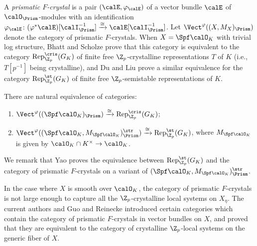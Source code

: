 A \emph{prismatic $F$-crystal} is a pair $(\calE,\varphi_\calE)$ of a vector bundle $\calE$ of $\calO_\Prism$-modules with an identification $\varphi_{\calE}\colon (\varphi^\ast\calE)[\calI_\Prism^{-1}]\xrightarrow{\cong}\calE[\calI_\Prism^{-1}]$. Let $\Vect^\varphi((X,M_X)_\Prism)$ denote the category of prismatic $F$-crystals.
When $X=\Spf \calO_K$ with trivial log structure, Bhatt and Scholze \cite{bhatt-scholze-prismaticFcrystal} prove that this category is equivalent to the category $\operatorname{Rep}_{\Z_p}^\cris(G_K)$ of finite free $\Z_p$-crystalline representations $T$ of $K$ (i.e., $T[p^{-1}]$ being crystalline), and Du and Liu \cite{du-liu-prismaticphiGhatmodule} prove a similar equivalence for the category $\operatorname{Rep}_{\Z_p}^\st(G_K)$ of finite free $\Z_p$-semistable representations of $K$.

\begin{thm} \label{thm:intro-BhattScholze-DuLiu}
There are natural equivalence of categories:
\begin{enumerate}
    \item $\Vect^\varphi((\Spf\calO_K)_\Prism)\xrightarrow{\cong}
\operatorname{Rep}_{\Z_p}^\cris(G_K)$;
    \item $\Vect^\varphi((\Spf\calO_K, M_{\Spf \calO_K})_\Prism^{\str}) \xrightarrow{\cong}
\operatorname{Rep}_{\Z_p}^\st(G_K)$, where $M_{\Spf \calO_K}$ is given by $\calO_K\cap K^\times\rightarrow \calO_K$.
\end{enumerate}
\end{thm}

\noindent We remark that Yao \cite{yao-lattices-semistable-representations} proves the equivalence between $\operatorname{Rep}_{\Z_p}^\st(G_K)$ and the category of prismatic $F$-crystals on a variant of $(\Spf\calO_K, M_{\Spf \calO_K})_\Prism^{\str}$.

In the case where $X$ is smooth over $\calO_K$, the category of prismatic $F$-crystals is not large enough to capture all the $\Z_p$-crystalline local systems on $X_\eta$. The current authors \cite{du-liu-moon-shimizu-completed-prismatic-F-crystal-loc-system} and Guo and Reinecke \cite{GuoReinecke-Ccris} introduced certain categories which contain the category of prismatic $F$-crystals in vector bundles on $X$, and proved that they are equivalent to the category of crystalline $\Z_p$-local systems on the generic fiber of $X$.

